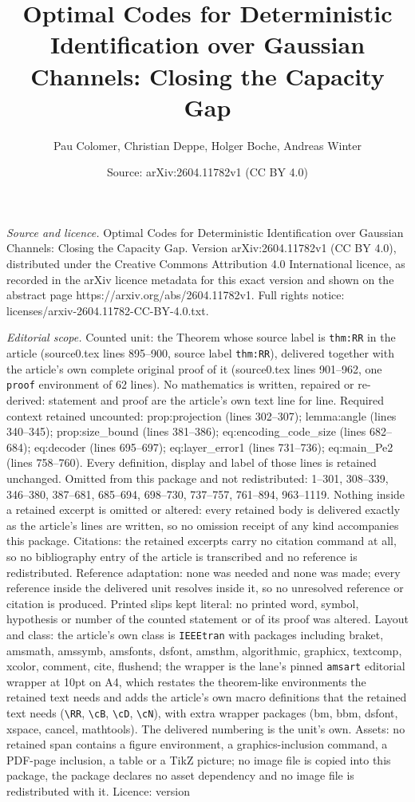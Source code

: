 \documentclass[10pt,a4paper]{amsart}
\title[Optimal Codes for Deterministic Identification over Gaussian]{Optimal Codes for Deterministic Identification over Gaussian Channels: Closing the Capacity Gap}
\author{Pau Colomer, Christian Deppe, Holger Boche, Andreas Winter}
\date{Source: arXiv:2604.11782v1 (CC BY 4.0)}
\begin{document}
\maketitle

\noindent\emph{Source and licence.} Optimal Codes for Deterministic Identification over Gaussian Channels: Closing the Capacity Gap. Version arXiv:2604.11782v1 (CC BY 4.0), distributed under the Creative Commons Attribution 4.0 International licence, as recorded in the arXiv licence metadata for this exact version and shown on the abstract page https://arxiv.org/abs/2604.11782v1. Full rights notice: licenses/arxiv-2604.11782-CC-BY-4.0.txt.\par\smallskip

\noindent\textit{Editorial scope.} Counted unit: the Theorem whose source label is \texttt{thm:RR} in the article (source0.tex lines 895--900, source label \texttt{thm:RR}), delivered together with the article's own complete original proof of it (source0.tex lines 901--962, one \texttt{proof} environment of 62 lines). No mathematics is written, repaired or re-derived: statement and proof are the article's own text line for line. Required context retained uncounted: prop:projection (lines 302--307); lemma:angle (lines 340--345); prop:size\_bound (lines 381--386); eq:encoding\_code\_size (lines 682--684); eq:decoder (lines 695--697); eq:layer\_error1 (lines 731--736); eq:main\_Pe2 (lines 758--760). Every definition, display and label of those lines is retained unchanged. Omitted from this package and not redistributed: 1--301, 308--339, 346--380, 387--681, 685--694, 698--730, 737--757, 761--894, 963--1119. Nothing inside a retained excerpt is omitted or altered: every retained body is delivered exactly as the article's lines are written, so no omission receipt of any kind accompanies this package. Citations: the retained excerpts carry no citation command at all, so no bibliography entry of the article is transcribed and no reference is redistributed. Reference adaptation: none was needed and none was made; every reference inside the delivered unit resolves inside it, so no unresolved reference or citation is produced. Printed slips kept literal: no printed word, symbol, hypothesis or number of the counted statement or of its proof was altered. Layout and class: the article's own class is \texttt{IEEEtran} with packages including braket, amsmath, amssymb, amsfonts, dsfont, amsthm, algorithmic, graphicx, textcomp, xcolor, comment, cite, flushend; the wrapper is the lane's pinned \texttt{amsart} editorial wrapper at 10pt on A4, which restates the theorem-like environments the retained text needs and adds the article's own macro definitions that the retained text needs (\texttt{\textbackslash RR}, \texttt{\textbackslash cB}, \texttt{\textbackslash cD}, \texttt{\textbackslash cN}), with extra wrapper packages (bm, bbm, dsfont, xspace, cancel, mathtools). The delivered numbering is the unit's own. Assets: no retained span contains a figure environment, a graphics-inclusion command, a PDF-page inclusion, a table or a TikZ picture; no image file is copied into this package, the package declares no asset dependency and no image file is redistributed with it. Licence: version 
\end{document}
